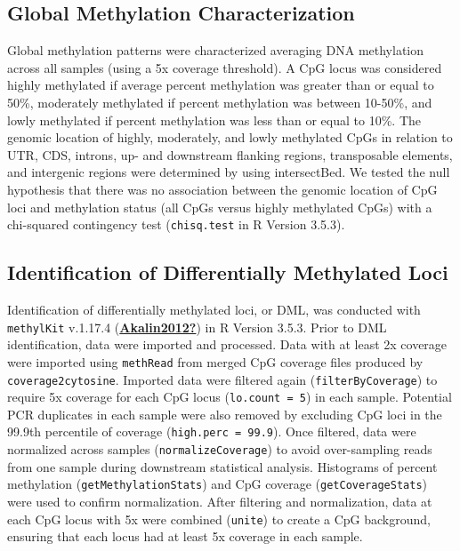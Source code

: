 \documentclass [11pt, proquest] {uwthesis}[2015/03/03]
\begin{document}
\hypertarget{global-methylation-characterization}{%
\subsection{Global Methylation Characterization}\label{global-methylation-characterization}}

Global methylation patterns were characterized averaging DNA methylation across all samples (using a 5x coverage threshold). A CpG locus was considered highly methylated if average percent methylation was greater than or equal to 50\%, moderately methylated if percent methylation was between 10-50\%, and lowly methylated if percent methylation was less than or equal to 10\%. The genomic location of highly, moderately, and lowly methylated CpGs in relation to UTR, CDS, introns, up- and downstream flanking regions, transposable elements, and intergenic regions were determined by using intersectBed. We tested the null hypothesis that there was no association between the genomic location of CpG loci and methylation status (all CpGs versus highly methylated CpGs) with a chi-squared contingency test (\texttt{chisq.test} in R Version 3.5.3).

\hypertarget{identification-of-differentially-methylated-loci}{%
\subsection{Identification of Differentially Methylated Loci}\label{identification-of-differentially-methylated-loci}}

Identification of differentially methylated loci, or DML, was conducted with \texttt{methylKit} v.1.17.4 (\protect\hyperlink{ref-Akalin2012}{\textbf{Akalin2012?}}) in R Version 3.5.3. Prior to DML identification, data were imported and processed. Data with at least 2x coverage were imported using \texttt{methRead} from merged CpG coverage files produced by \texttt{coverage2cytosine}. Imported data were filtered again (\texttt{filterByCoverage}) to require 5x coverage for each CpG locus (\texttt{lo.count\ =\ 5}) in each sample. Potential PCR duplicates in each sample were also removed by excluding CpG loci in the 99.9th percentile of coverage (\texttt{high.perc\ =\ 99.9}). Once filtered, data were normalized across samples (\texttt{normalizeCoverage}) to avoid over-sampling reads from one sample during downstream statistical analysis. Histograms of percent methylation (\texttt{getMethylationStats}) and CpG coverage (\texttt{getCoverageStats}) were used to confirm normalization. After filtering and normalization, data at each CpG locus with 5x were combined (\texttt{unite}) to create a CpG background, ensuring that each locus had at least 5x coverage in each sample.
\end{document}

